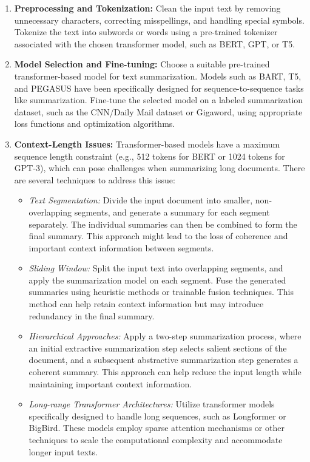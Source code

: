 \documentclass[12pt]{article}
\begin{document}
\begin{enumerate}
\item \textbf{Preprocessing and Tokenization:} Clean the input text by removing unnecessary characters, correcting misspellings, and handling special symbols. Tokenize the text into subwords or words using a pre-trained tokenizer associated with the chosen transformer model, such as BERT, GPT, or T5.
\item \textbf{Model Selection and Fine-tuning:} Choose a suitable pre-trained transformer-based model for text summarization. Models such as BART, T5, and PEGASUS have been specifically designed for sequence-to-sequence tasks like summarization. Fine-tune the selected model on a labeled summarization dataset, such as the CNN/Daily Mail dataset or Gigaword, using appropriate loss functions and optimization algorithms.

\item \textbf{Context-Length Issues:} Transformer-based models have a maximum sequence length constraint (e.g., 512 tokens for BERT or 1024 tokens for GPT-3), which can pose challenges when summarizing long documents. There are several techniques to address this issue:

    \begin{itemize}
        \item \textit{Text Segmentation:} Divide the input document into smaller, non-overlapping segments, and generate a summary for each segment separately. The individual summaries can then be combined to form the final summary. This approach might lead to the loss of coherence and important context information between segments.
        
        \item \textit{Sliding Window:} Split the input text into overlapping segments, and apply the summarization model on each segment. Fuse the generated summaries using heuristic methods or trainable fusion techniques. This method can help retain context information but may introduce redundancy in the final summary.
        
        \item \textit{Hierarchical Approaches:} Apply a two-step summarization process, where an initial extractive summarization step selects salient sections of the document, and a subsequent abstractive summarization step generates a coherent summary. This approach can help reduce the input length while maintaining important context information.
        
        \item \textit{Long-range Transformer Architectures:} Utilize transformer models specifically designed to handle long sequences, such as Longformer or BigBird. These models employ sparse attention mechanisms or other techniques to scale the computational complexity and accommodate longer input texts.
    \end{itemize}
    

\end{enumerate}
\end{document}
